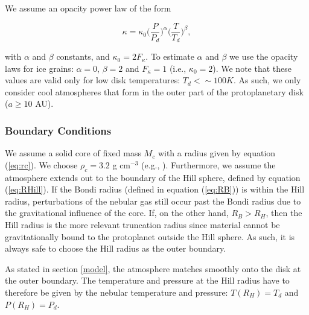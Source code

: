 \documentclass[apj]{emulateapj}
\begin{document}
We assume an opacity power law of the form

\begin{equation}
\label{eq:opacitylaw}
\kappa=\kappa_0 \Big(\frac{P}{P_d}\Big)^{\alpha} \Big(\frac{T}{T_d}\Big)^{\beta},
\end{equation}  

\noindent with $\alpha$ and $\beta$ constants, and $\kappa_0=2 F_{\kappa}$. To estimate $\alpha$ and $\beta$ we use the \citet{bell94} opacity laws for ice grains: $\alpha =0 $, $\beta=2$ and $F_{\kappa}=1$ (i.e., $\kappa_0=2$). We note that these values are valid only for low disk temperatures: $T_d< \sim 100 K$. As such, we only consider cool atmospheres that form in the outer part of the protoplanetary disk ($a \geq 10$ AU).

\subsubsection{Boundary Conditions}
\label{BCs}

We assume a solid core of fixed mass $M_c$ with a radius given by equation (\ref{eq:rc}). We choose $\rho_c=3.2$ g cm$^{-3}$ (e.g., \citealt{pap99}). Furthermore, we assume the atmosphere extends out to the boundary of the Hill sphere, defined by equation (\ref{eq:RHill}). If the Bondi radius (defined in equation (\ref{eq:RB})) is within the Hill radius, perturbations of the nebular gas still occur past the Bondi radius due to the gravitational influence of the core. If, on the other hand, $R_B>R_H$, then the Hill radius is the more relevant truncation radius since material cannot be gravitationally bound to the protoplanet outside the Hill sphere. As such, it is always safe to choose the Hill radius as the outer boundary.

As stated in section \ref{model}, the atmosphere matches smoothly onto the disk at the outer boundary. The temperature and pressure at the Hill radius have to therefore be given by the nebular temperature and pressure: $T(R_H)=T_d$ and $P(R_H)=P_d$. 

\end{document}
